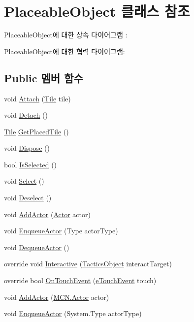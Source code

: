 \hypertarget{class_placeable_object}{}\section{Placeable\+Object 클래스 참조}
\label{class_placeable_object}


Placeable\+Object에 대한 상속 다이어그램 \+: 


Placeable\+Object에 대한 협력 다이어그램\+:
\subsection*{Public 멤버 함수}
\begin{DoxyCompactItemize}
\item 
void \hyperlink{class_placeable_object_a3176ec3d5d26b2a83cdc58b01e630aa1}{Attach} (\hyperlink{class_tile}{Tile} tile)
\item 
void \hyperlink{class_placeable_object_aef2018b58bf7c8c0fab5aaf3d9a154d4}{Detach} ()
\item 
\hyperlink{class_tile}{Tile} \hyperlink{class_placeable_object_ab44a9b122632ac3cf0babb5040e8a201}{Get\+Placed\+Tile} ()
\item 
void \hyperlink{class_placeable_object_a8bd49b7db556556502a0518fc833be48}{Dispose} ()
\item 
bool \hyperlink{class_placeable_object_a71fd42914caa0dc6229fe6a5ffe09b99}{Is\+Selected} ()
\item 
void \hyperlink{class_placeable_object_a019818f3f6c6eb715fed163efa921f5a}{Select} ()
\item 
void \hyperlink{class_placeable_object_a0c1248b1f9981ddbf68e6f70a6498f3d}{Deselect} ()
\item 
void \hyperlink{class_placeable_object_a4f7ac210f2729a35d88a22d7f286ade5}{Add\+Actor} (\hyperlink{class_m_c_n_1_1_actor}{Actor} actor)
\item 
void \hyperlink{class_placeable_object_ad21b0a166f06cf406fd2ffdeee04eb3b}{Enqueue\+Actor} (Type actor\+Type)
\item 
void \hyperlink{class_placeable_object_a4df6b98c3e629a1deedb8c8b740e9b04}{Dequeue\+Actor} ()
\item 
override void \hyperlink{class_placeable_object_a167a3ebbac7456ea823c0b51ee37046d}{Interactive} (\hyperlink{class_tactics_object}{Tactics\+Object} interact\+Target)
\item 
override bool \hyperlink{class_placeable_object_a2807603db9cda7bcec8c9d83aa08e44b}{On\+Touch\+Event} (\hyperlink{_touch_manager_8cs_ae33e321a424fe84ba8b2fdb81ad40a68}{e\+Touch\+Event} touch)
\item 
void \hyperlink{interface_m_c_n_1_1_i_actor_queue_a4ff84085475a9689d242fea2861d6f1e}{Add\+Actor} (\hyperlink{class_m_c_n_1_1_actor}{M\+C\+N.\+Actor} actor)
\item 
void \hyperlink{interface_m_c_n_1_1_i_actor_queue_a363cf9df4d42c417cab5b14952f95ebd}{Enqueue\+Actor} (System.\+Type actor\+Type)
\end{DoxyCompactItemize}
